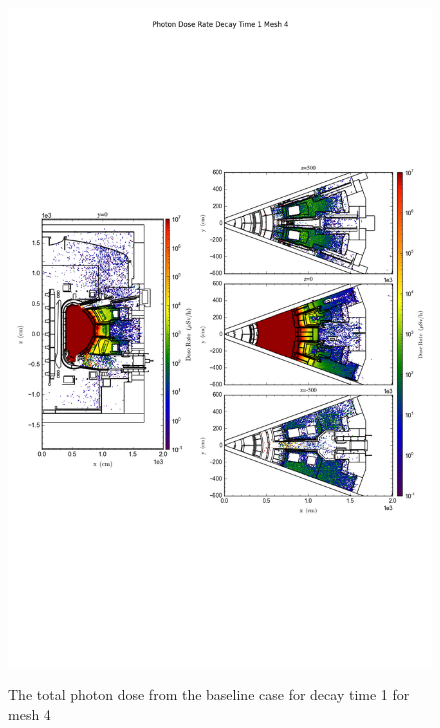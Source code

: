 \begin{figure}[ht!]
\centering
\includegraphics[trim={0cm 9cm 0cm 10cm},clip,scale=0.75]{../plots/final_model/Photon_Dose_Rate_Decay_Time_1_Mesh_4.png}
\label{fig:photons_dc1_no4bc_m4_flux}
\caption{The total photon dose from the baseline case for decay time 1 for mesh 4}
\end{figure}

